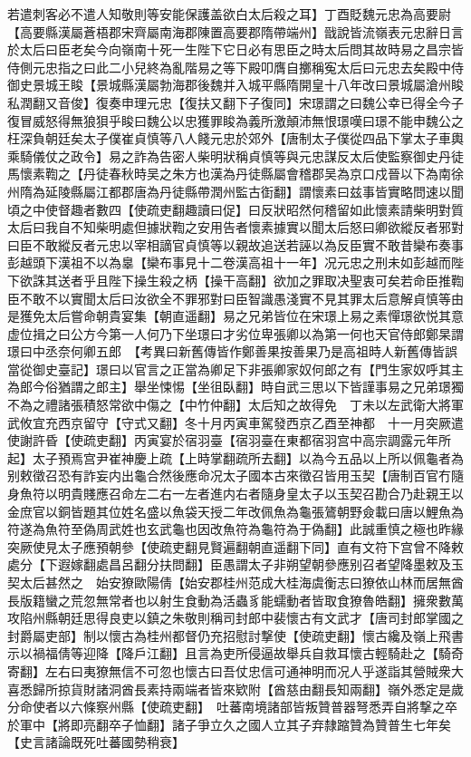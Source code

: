 若遣刺客必不遣人知敬則等安能保護盖欲白太后殺之耳】丁酉貶魏元忠為高要尉【高要縣漢屬蒼梧郡宋齊屬南海郡陳置高要郡隋帶端州】戩說皆流嶺表元忠辭日言於太后曰臣老矣今向嶺南十死一生陛下它日必有思臣之時太后問其故時易之昌宗皆侍側元忠指之曰此二小兒終為亂階易之等下殿叩膺自擲稱寃太后曰元忠去矣殿中侍御史景城王睃【景城縣漢屬勃海郡後魏并入城平縣隋開皇十八年改曰景城屬滄州睃私潤翻又音俊】復奏申理元忠【復扶又翻下子復同】宋璟謂之曰魏公幸已得全今子復冒威怒得無狼狽乎睃曰魏公以忠獲罪睃為義所激顛沛無恨璟嘆曰璟不能申魏公之枉深負朝廷矣太子僕崔貞慎等八人餞元忠於郊外【唐制太子僕從四品下掌太子車輿乘騎儀仗之政令】易之詐為告密人柴明狀稱貞慎等與元忠謀反太后使監察御史丹徒馬懷素鞫之【丹徒春秋時吴之朱方也漢為丹徒縣屬會稽郡吴為京口戍晉以下為南徐州隋為延陵縣屬江都郡唐為丹徒縣帶潤州監古衘翻】謂懷素曰兹事皆實略問速以聞頃之中使督趣者數四【使疏吏翻趣讀曰促】曰反狀昭然何稽留如此懷素請柴明對質太后曰我自不知柴明處但據狀鞫之安用告者懷素據實以聞太后怒曰卿欲縱反者邪對曰臣不敢縱反者元忠以宰相謫官貞慎等以親故追送若誣以為反臣實不敢昔欒布奏事彭越頭下漢祖不以為辠【欒布事見十二卷漢高祖十一年】况元忠之刑未如彭越而陛下欲誅其送者乎且陛下操生殺之柄【操干高翻】欲加之罪取决聖衷可矣若命臣推鞫臣不敢不以實聞太后曰汝欲全不罪邪對曰臣智識愚淺實不見其罪太后意解貞慎等由是獲免太后嘗命朝貴宴集【朝直遥翻】易之兄弟皆位在宋璟上易之素憚璟欲悦其意虚位揖之曰公方今第一人何乃下坐璟曰才劣位卑張卿以為第一何也天官侍郎鄭杲謂璟曰中丞奈何卿五郎　【考異曰新舊傳皆作鄭善果按善果乃是高祖時人新舊傳皆誤當從御史臺記】璟曰以官言之正當為卿足下非張卿家奴何郎之有【門生家奴呼其主為郎今俗猶謂之郎主】舉坐悚惕【坐徂臥翻】時自武三思以下皆謹事易之兄弟璟獨不為之禮諸張積怒常欲中傷之【中竹仲翻】太后知之故得免　丁未以左武衛大將軍武攸宜充西京留守【守式又翻】冬十月丙寅車駕發西京乙酉至神都　十一月突厥遣使謝許昏【使疏吏翻】丙寅宴於宿羽臺【宿羽臺在東都宿羽宫中高宗調露元年所起】太子預焉宫尹崔神慶上疏【上時掌翻疏所去翻】以為今五品以上所以佩龜者為别敕徵召恐有詐妄内出龜合然後應命况太子國本古來徵召皆用玉契【唐制百官冇隨身魚符以明貴賤應召命左二右一左者進内右者隨身皇太子以玉契召勘合乃赴親王以金庶官以銅皆題其位姓名盛以魚袋天授二年改佩魚為龜張鷟朝野僉載曰唐以鯉魚為符遂為魚符至偽周武姓也玄武龜也因改魚符為龜符為于偽翻】此誠重慎之極也昨緣突厥使見太子應預朝參【使疏吏翻見賢遍翻朝直遥翻下同】直有文符下宫曾不降敕處分【下遐嫁翻處昌呂翻分扶問翻】臣愚謂太子非朔望朝參應别召者望降墨敕及玉契太后甚然之　始安獠歐陽倩【始安郡桂州范成大桂海虞衡志曰獠依山林而居無酋長版籍蠻之荒忽無常者也以射生食動為活蟲豸能蠕動者皆取食獠魯皓翻】擁衆數萬攻陷州縣朝廷思得良吏以鎮之朱敬則稱司封郎中裴懷古有文武才【唐司封郎掌國之封爵屬吏部】制以懷古為桂州都督仍充招慰討撃使【使疏吏翻】懷古纔及嶺上飛書示以禍福倩等迎降【降戶江翻】且言為吏所侵逼故舉兵自救耳懷古輕騎赴之【騎奇寄翻】左右曰夷獠無信不可忽也懷古曰吾仗忠信可通神明而况人乎遂詣其營賊衆大喜悉歸所掠貨財諸洞酋長素持兩端者皆來欵附【酋慈由翻長知兩翻】嶺外悉定是歲分命使者以六條察州縣【使疏吏翻】　吐蕃南境諸部皆叛贊普器弩悉弄自將撃之卒於軍中【將即亮翻卒子恤翻】諸子爭立久之國人立其子弃隸蹜贊為贊普生七年矣【史言諸論既死吐蕃國勢稍衰】

